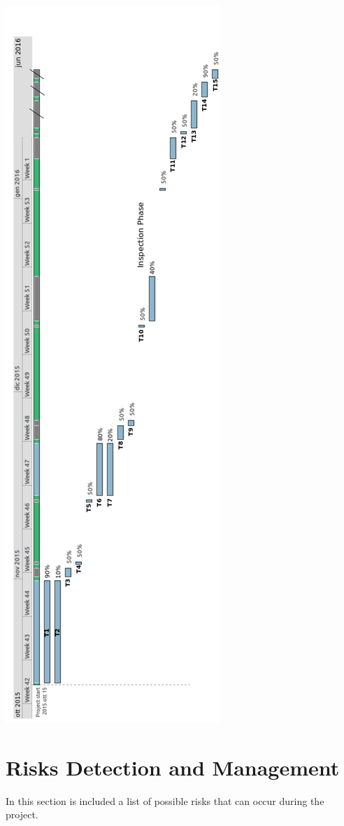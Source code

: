 \documentclass[11pt,titlepage]{article} %
\begin{document}
  \begin{center}
       \includegraphics[scale=0.35]{res2.png}
  \end{center}

\newpage
\section{Risks Detection and Management}
In this section is included a list of possible risks that can occur during the project.\newline
\end{document}
